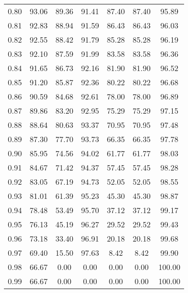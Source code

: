 \begin{tabular}{|c|c|c|c|c|c|c|}
      0.80 &     93.06 &     89.36 &      91.41 &   87.40 &      87.40 &         95.89 \\
      0.81 &     92.83 &     88.94 &      91.59 &   86.43 &      86.43 &         96.03 \\
      0.82 &     92.55 &     88.42 &      91.79 &   85.28 &      85.28 &         96.19 \\
      0.83 &     92.10 &     87.59 &      91.99 &   83.58 &      83.58 &         96.36 \\
      0.84 &     91.65 &     86.73 &      92.16 &   81.90 &      81.90 &         96.52 \\
      0.85 &     91.20 &     85.87 &      92.36 &   80.22 &      80.22 &         96.68 \\
      0.86 &     90.59 &     84.68 &      92.61 &   78.00 &      78.00 &         96.89 \\
      0.87 &     89.86 &     83.20 &      92.95 &   75.29 &      75.29 &         97.15 \\
      0.88 &     88.64 &     80.63 &      93.37 &   70.95 &      70.95 &         97.48 \\
      0.89 &     87.30 &     77.70 &      93.73 &   66.35 &      66.35 &         97.78 \\
      0.90 &     85.95 &     74.56 &      94.02 &   61.77 &      61.77 &         98.03 \\
      0.91 &     84.67 &     71.42 &      94.37 &   57.45 &      57.45 &         98.28 \\
      0.92 &     83.05 &     67.19 &      94.73 &   52.05 &      52.05 &         98.55 \\
      0.93 &     81.01 &     61.39 &      95.23 &   45.30 &      45.30 &         98.87 \\
      0.94 &     78.48 &     53.49 &      95.70 &   37.12 &      37.12 &         99.17 \\
      0.95 &     76.13 &     45.19 &      96.27 &   29.52 &      29.52 &         99.43 \\
      0.96 &     73.18 &     33.40 &      96.91 &   20.18 &      20.18 &         99.68 \\
      0.97 &     69.40 &     15.50 &      97.63 &    8.42 &       8.42 &         99.90 \\
      0.98 &     66.67 &      0.00 &       0.00 &    0.00 &       0.00 &        100.00 \\
      0.99 &     66.67 &      0.00 &       0.00 &    0.00 &       0.00 &        100.00 \\
\bottomrule
\end{tabular}
